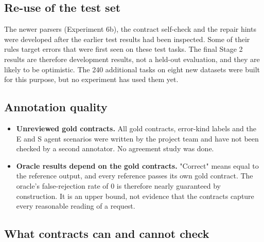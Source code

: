 \documentclass[11pt]{article}
\providecommand{\tightlist}{\setlength{\itemsep}{0pt}\setlength{\parskip}{0pt}}
\begin{document}
\subsection{Re-use of the test set}

The newer parsers (Experiment 6b), the contract self-check and the
repair hints were developed after the earlier test results had been
inspected. Some of their rules target errors that were first seen on
these test tasks. The final Stage 2 results are therefore development
results, not a held-out evaluation, and they are likely to be
optimistic. The 240 additional tasks on eight new datasets were built
for this purpose, but no experiment has used them yet.

\subsection{Annotation quality}

\begin{itemize}
\tightlist
\item
  \textbf{Unreviewed gold contracts.} All gold contracts, error-kind
  labels and the E and S agent scenarios were written by the project
  team and have not been checked by a second annotator. No agreement
  study was done.
\item
  \textbf{Oracle results depend on the gold contracts.} "Correct" means
  equal to the reference output, and every reference passes its own gold
  contract. The oracle's false-rejection rate of 0 is therefore nearly
  guaranteed by construction. It is an upper bound, not evidence that
  the contracts capture every reasonable reading of a request.
\end{itemize}

\subsection{What contracts can and cannot check}
\end{document}
